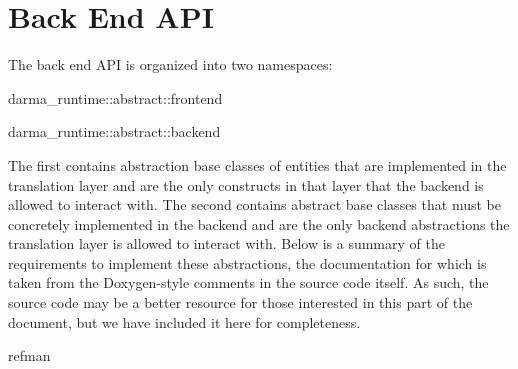 
\chapter{Back End API}
\label{chap:back_end}

The back end API is organized into two namespaces:
\begin{compactenum}
\item {\ttfamily darma\_runtime::abstract::frontend} 
\item {\ttfamily darma\_runtime::abstract::backend}  
\end{compactenum}

The first contains
abstraction base classes of entities that are implemented in the translation
layer and are the only constructs in that layer that the backend is
allowed to interact with.  The second contains abstract base classes that must be concretely implemented in the backend and
are the only backend abstractions the translation layer is allowed to interact
with.  Below is a summary of the requirements to implement these abstractions,
the documentation for which is taken from the Doxygen-style comments in
the source code itself.  As such, the source code may be a better resource for
those interested in this part of the document, but we have included it here for
completeness.  


{refman}
